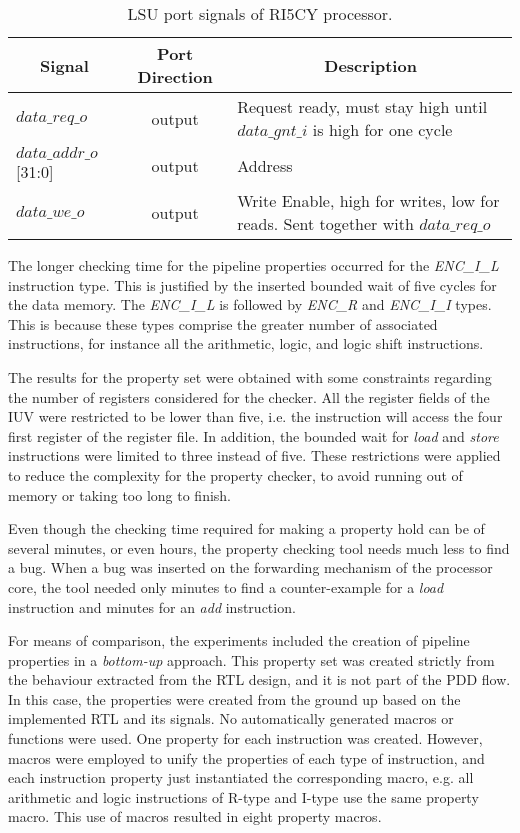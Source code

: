 \begin{table*}[htb!] 
	\centering 
	\caption{LSU port signals of RI5CY processor\cite{manual-ri5cy}.} 
	\label{tab:pipe-s2qed-check-resutls}
	\begin{tabular}{l|c|p{7cm}} 
		\multicolumn{1}{c}{\bfseries Signal} & \multicolumn{1}{c}{\bfseries Port Direction} & \multicolumn{1}{c}{\bfseries Description} \\     
		\hline	
		$data\_req\_o$  &  output & Request ready, must stay high until $data\_gnt\_i$ is        high for one cycle \\
		\hline
		$data\_addr\_o$[31:0]  &  output & Address \\
		\hline
		$data\_we\_o$  &  output & Write Enable, high for writes, low for reads. Sent            together with $data\_req\_o$ \\
	\end{tabular} 
\end{table*}

The longer checking time for the pipeline properties occurred for the \textit{ENC\_I\_L} instruction type. This is justified by the inserted bounded wait of five cycles for the data memory. The \textit{ENC\_I\_L} is followed by \textit{ENC\_R} and \textit{ENC\_I\_I} types. This is because these types comprise the greater number of associated instructions, for instance all the arithmetic, logic, and logic shift instructions. 

The results for the \SSQED{} property set were obtained with some constraints regarding the number of registers considered for the checker. All the register fields of the IUV were restricted to be lower than five, i.e. the instruction will access the four first register of the register file. In addition, the bounded wait for \textit{load} and \textit{store} instructions were limited to three instead of five. These restrictions were applied to reduce the complexity for the property checker, to avoid running out of memory or taking too long to finish.

Even though the checking time required for making a property hold can be of several minutes, or even hours, the property checking tool needs much less to find a bug. When a bug was inserted on the forwarding mechanism of the processor core, the tool needed only  minutes to find a counter-example for a \textit{load} instruction and   minutes for an \textit{add} instruction.

For means of comparison, the experiments included the creation of pipeline properties in a \textit{bottom-up} approach. This property set was created strictly from the behaviour extracted from the RTL design, and it is not part of the PDD flow. In this case, the properties were created from the ground up based on the implemented RTL and its signals. No automatically generated macros or functions were used. One property for each instruction was created. However, macros were employed to unify the properties of each type of instruction, and each instruction property just instantiated the corresponding macro, e.g. all arithmetic and logic instructions of R-type and I-type use the same property macro. This use of macros resulted in eight property macros.

